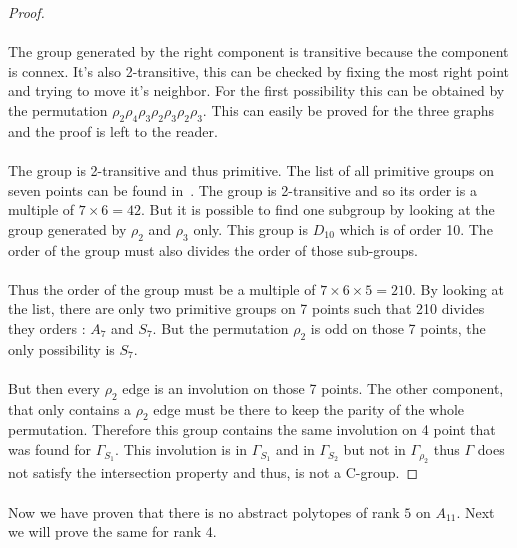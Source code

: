\begin{proof}
  \paragraph{}
  The group generated by the right component is transitive because the component is connex. It's also 2-transitive, this can be checked by fixing the most right point and trying to move it's neighbor. For the first possibility this can be obtained by the permutation $\rho_2 \rho_4 \rho_3 \rho_2 \rho_3 \rho_2 \rho_3$. This can easily be proved for the three graphs and the proof is left to the reader.

  \paragraph{}
  The group is 2-transitive and thus primitive. The list of all primitive groups on seven points can be found in~\cite{buekenhout1996list}. The group is 2-transitive and so its order is a multiple of $7 \times 6 = 42$. But it is possible to find one subgroup by looking at the group generated by $\rho_2$ and $\rho_3$ only. This group is $D_{10}$ which is of order 10. The order of the group must also divides the order of those sub-groups.

  \paragraph{}
  Thus the order of the group must be a multiple of $7 \times 6 \times 5 = 210$. By looking at the list, there are only two primitive groups on 7 points such that 210 divides they orders : $A_7$ and $S_7$. But the permutation $\rho_2$ is odd on those 7 points, the only possibility is $S_7$.

  \paragraph{}
  But then every $\rho_2$ edge is an involution on those 7 points. The other component, that only contains a $\rho_2$ edge must be there to keep the parity of the whole permutation. Therefore this group contains the same involution on 4 point that was found for $\Gamma_{S_1}$. This involution is in $\Gamma_{S_1}$ and in $\Gamma_{S_2}$ but not in $\Gamma_{\rho_2}$ thus $\Gamma$ does not satisfy the intersection property and thus, is not a C-group.

\end{proof}

\paragraph{}
Now we have proven that there is no abstract polytopes of rank $5$ on $A_{11}$. Next we will prove the same for rank 4.
